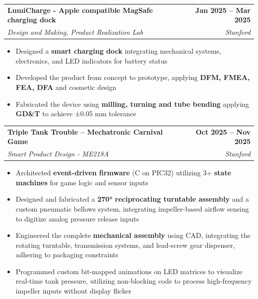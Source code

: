 \documentclass[a4paper,11pt]{article}
\makeatletter
\newcommand{\resumeItem}[1]{
  \item\small{
    {#1 \vspace{-2pt}}
  }
}
\newcommand{\resumeSubheading}[4]{
  \vspace{-2pt}\item
    \begin{tabular*}{1.0\textwidth}[t]{l@{\extracolsep{\fill}}r}
      \textbf{#1} & \textbf{\small #2} \\
      \textit{\small#3} & \textit{\small #4} \\
    \end{tabular*}\vspace{-7pt}
}
\newcommand{\resumeProjectHeading}[2]{
    \item
    \begin{tabular*}{1.001\textwidth}{l@{\extracolsep{\fill}}r}
      \small#1 & \textbf{\small #2}\\
    \end{tabular*}\vspace{-7pt}
}
\newcommand{\resumeItemListStart}{\begin{itemize}}
\newcommand{\resumeItemListEnd}{\end{itemize}\vspace{-5pt}}
\makeatother
\begin{document}
  \resumeSubheading
{LumiCharge - Apple compatible MagSafe charging dock}{Jan 2025 -- Mar 2025}{Design and Making, Product Realization Lab}{Stanford}
      \resumeItemListStart
 \resumeItem{Designed a \textbf{smart charging dock} integrating mechanical systems, electronics, and LED indicators for battery status}\resumeItem{Developed the product from concept to prototype, applying \textbf{DFM, FMEA, FEA, DFA} and cosmetic design}
 \resumeItem{Fabricated the device using \textbf{milling, turning and tube bending} applying \textbf{GD\&T} to achieve ±0.05 mm tolerance}
  \resumeItemListEnd
  \resumeSubheading
      {Triple Tank Trouble – Mechatronic Carnival Game}{Oct 2025 -- Nov 2025}
      {Smart Product Design - ME218A}{Stanford}
      \resumeItemListStart
 \resumeItem{ Architected \textbf{event-driven firmware} (C on PIC32) utilizing 3+ \textbf{state machines} for game logic and sensor inputs}\resumeItem{Designed and fabricated a \textbf{270° reciprocating turntable assembly} and a custom pneumatic bellows system, integrating impeller-based airflow sensing to digitize analog pressure release inputs}
 \resumeItem{Engineered the complete \textbf{mechanical assembly} using CAD, integrating the rotating turntable, transmission systems, and lead-screw gear dispenser, adhering to packaging constraints}
 \resumeItem{Programmed custom bit-mapped animations on LED matrices to visualize real-time tank pressure, utilizing non-blocking code to process high-frequency impeller inputs without display flicker}
 \resumeItemListEnd
\end{document}
